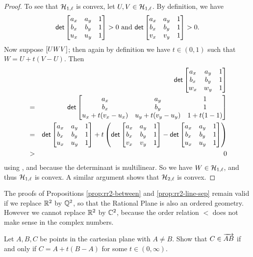 \begin{proof}
To see that \(\mathcal{H}_{1,\ell}\) is convex, let \(U,V \in \mathcal{H}_{1,\ell}\).
By definition, we have \[ \mathsf{det} \begin{bmatrix} a_x & a_y & 1 \\ b_x & b_y & 1 \\ u_x & u_y & 1 \end{bmatrix} > 0\ \mathrm{and}\ \mathsf{det} \begin{bmatrix} a_x & a_y & 1 \\ b_x & b_y & 1 \\ v_x & v_y & 1 \end{bmatrix} > 0. \]
Now suppose \([ U W V ]\); then again by definition we have \(t \in (0,1)\) such that \(W = U + t(V-U)\).
Then
\begin{eqnarray*}
 & & \mathsf{det} \begin{bmatrix} a_x & a_y & 1 \\ b_x & b_y & 1 \\ w_x & w_y & 1 \end{bmatrix} \\
 & = & \mathsf{det} \begin{bmatrix} a_x & a_y & 1 \\ b_x & b_y & 1 \\ u_x + t(v_x - u_x) & u_y + t(v_y - u_y) & 1 + t(1 - 1) \end{bmatrix} \\
 & = & \mathsf{det} \begin{bmatrix} a_x & a_y & 1 \\ b_x & b_y & 1 \\ u_x & u_y & 1 \end{bmatrix} + t \left( \mathsf{det} \begin{bmatrix} a_x & a_y & 1 \\ b_x & b_y & 1 \\ v_x & v_y & 1 \end{bmatrix} - \mathsf{det} \begin{bmatrix} a_x & a_y & 1 \\ b_x & b_y & 1 \\ u_x & u_y & 1 \end{bmatrix} \right) \\
 & > & 0
\end{eqnarray*}
using , and because the determinant is multilinear.
So we have \(W \in \mathcal{H}_{1,\ell}\), and thus \(\mathcal{H}_{1,\ell}\) is convex.
A similar argument shows that \(\mathcal{H}_{2,\ell}\) is convex.
\end{proof}

The proofs of Propositions \ref{prop:rr2-between} and \ref{prop:rr2-line-sep} remain valid if we replace \(\mathbb{R}^2\) by \(\mathbb{Q}^2\), so that the Rational Plane is also an ordered geometry.
However we cannot replace \(\mathbb{R}^2\) by \(\mathbb{C}^2\), because the order relation \(<\) does not make sense in the complex numbers.



\Exercises%

\begin{exercise}\label{exerc:rr2-ray-positive}
Let \(A,B,C\) be points in the cartesian plane with \(A \neq B\).
Show that \(C \in \overrightarrow{AB}\) if and only if \(C = A + t(B - A)\) for some \(t \in (0,\infty)\).
\end{exercise}
